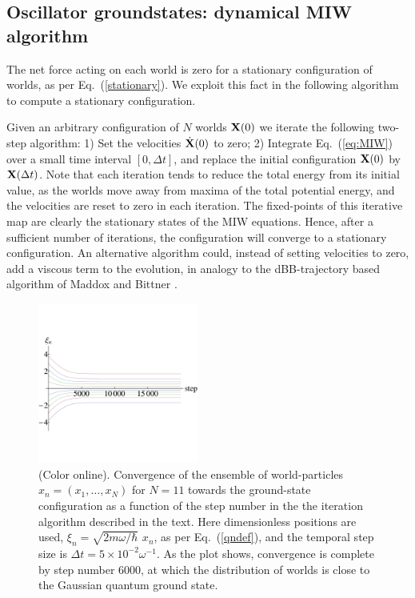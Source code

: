 \documentclass[12pt, aps,pra,amsmath,amssymb,superscriptaddress]{revtex4-2}
\renewcommand{\(}{\left(}
\renewcommand{\)}{\right)}
\newcommand{\blk}{\color{black}}
\begin{document}
\subsection{Oscillator groundstates: dynamical MIW algorithm}

The net force acting on each world is zero for a stationary configuration of
worlds, as per Eq.~(\ref{stationary}). We exploit this fact in the following
algorithm to compute a stationary configuration. \blk

Given an arbitrary configuration of $N$ worlds ${\bf X}(0)$ we iterate the
following two-step algorithm: \blk 1) Set the velocities $\dot{\bf X}(0)$ to zero; 2) 
Integrate Eq.~(\ref{eq:MIW}) over a small time interval $[0,\Delta t]$, and replace the
initial
configuration ${\bf X}(0)$ by
${\bf X}( \Delta t)$. 
Note that each iteration tends to reduce the
total energy from its initial value, as the worlds move away from maxima of the
total potential energy, and the velocities are reset to zero in each
iteration.  The fixed-points of this iterative map are clearly the stationary
states of the MIW equations.   Hence, after a sufficient number of iterations,
the configuration will converge to a stationary configuration.  An alternative algorithm could, instead of setting velocities to zero, add a viscous term to the evolution, in analogy to the dBB-trajectory based algorithm of Maddox and Bittner \cite{mad}.

\begin{figure}[!t]
	\centering
    \includegraphics[width=0.47\textwidth]{groundstate-trajectories.pdf}
    \caption{\label{trajectories} (Color online).
  Convergence of the ensemble of 
 world-particles $x_n =(x_1,\ldots,x_N)$ for $N=11$ towards the ground-state configuration
 as a function of the step number in the the iteration algorithm described in the text. 
  Here dimensionless positions are used, $\xi_n = \sqrt{2m\omega/\hbar} \,\,x_n$, as per Eq.~(\ref{qndef}),
  and the temporal step size is 
 $\Delta t = 5\times 10^{-2} \omega^{-1}$.  As the plot shows, convergence is complete by step number 6000, 
  at which the 
        distribution of worlds is close to the Gaussian quantum ground state. }
  \end{figure}
  
\end{document}
